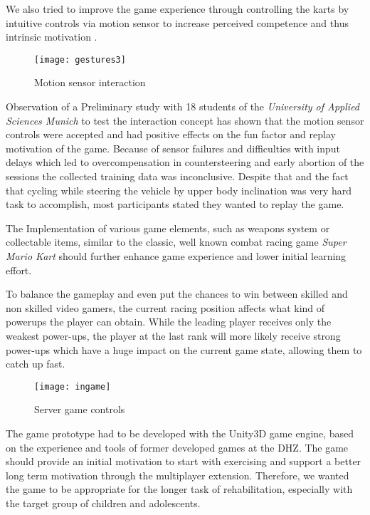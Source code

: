 \begin{multicols}{2}
We also tried to improve the game experience through controlling the karts by intuitive controls via motion sensor to increase perceived competence and thus intrinsic motivation \cite{Ryan2006SDT}.
\begin{figure}[H]
  \centering
    \texttt{[image: gestures3]}
 \caption{Motion sensor interaction}
\end{figure}
Observation of a Preliminary study with 18 students of the \emph{University of Applied Sciences Munich} to test the interaction concept has shown that the motion sensor controls were accepted and had positive effects on the fun factor and replay motivation of the game. Because of sensor failures and difficulties with input delays which led to overcompensation in countersteering and early abortion of the sessions the collected training data was inconclusive. Despite that and the fact that cycling while steering the vehicle by upper body inclination was very hard task to accomplish, most participants stated they wanted to replay the game.

The Implementation of various game elements, such as weapons system or collectable items, similar to the classic, well known combat racing game \emph{ Super Mario Kart} \cite{NitendoWiiMario} should further enhance game experience and lower initial learning effort. 

To balance the gameplay and even put the chances to win between skilled and non skilled video gamers, the current racing position affects what kind of powerups the player can obtain. While the leading player receives only the weakest power-ups, the player at the last rank will more likely receive strong power-ups which have a huge impact on the current game state, allowing them to catch up fast.

\begin{figure}[H]
  \texttt{[image: ingame]}
  \caption{Server game controls}
\end{figure}


The game prototype had to be developed with the Unity3D game engine, based on the experience and tools of former developed games at the DHZ. The game should provide an initial motivation to start with exercising and support a better long term motivation through the multiplayer extension. Therefore, we wanted the game to be appropriate for the longer task of rehabilitation, especially with the target group of children and adolescents. 


\end{multicols}
